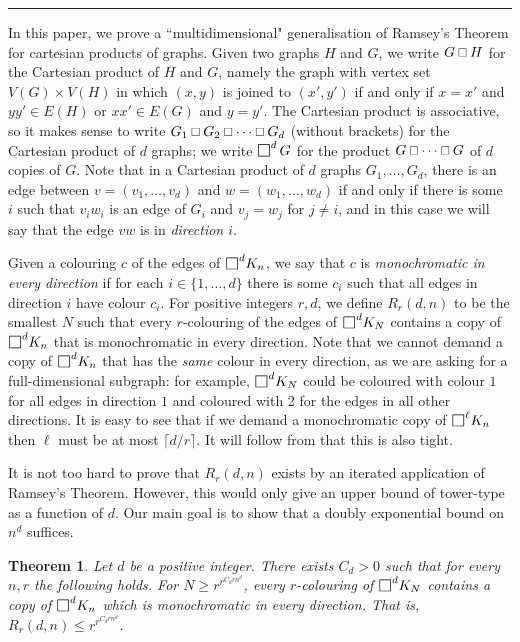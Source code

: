 \documentclass[10pt]{article}
\newtheorem{theorem}{Theorem}[section]
\DeclareMathOperator*{\ourbox}{\text{\raisebox{-0.25ex}{\scalebox{1.25}{$\square$}}}}
\newcommand\Osq{\mathbin{\text{\scalebox{.84}{$\square$}}}}
\begin{document}
\medskip\hrule\medskip
\setcounter{section}{1}\setcounter{theorem}{0}
In this paper, we prove a ``multidimensional" generalisation of Ramsey's Theorem for cartesian products of graphs. 
Given two graphs $H$ and $G$, we write $G\Osq H$ for the Cartesian product of $H$ and $G$, namely the graph 
with vertex set $V(G)\times V(H)$ in which $(x,y)$ is joined to $(x',y')$ if and only if $x=x'$ and $yy'\in E(H)$ 
or $xx'\in E(G)$ and $y=y'$.  The Cartesian product is associative, so it makes sense to write $G_1\Osq G_2\Osq\cdots\Osq G_d$ (without brackets) for the Cartesian product of $d$ graphs; we write $\ourbox^{d}G$ 
for the product $G\Osq\cdots\Osq G$ of $d$ copies of $G$. Note that in a Cartesian product of $d$ graphs $G_1,\dots,G_d$, there is an edge between $v=(v_1,\dots,v_d)$ and $w=(w_1,\dots,w_d)$ if and only if there is some $i$ such that $v_iw_i$ is an edge of $G_i$ and $v_j=w_j$ for $j\ne i$, and in this case we will say that the edge $vw$ is in {\em direction $i$}.

Given a colouring $c$ of the edges of $\ourbox^{d}\!K_n$, we say that $c$ is {\em monochromatic in every direction} if for each $i\in\{1,\dots,d\}$ there is some $c_i$ such that all edges in direction $i$ have colour $c_i$.  
For positive integers $r,d$, we define 
$R_r(d,n)$ to be the smallest $N$ such that every $r$-colouring of the edges of $\ourbox^{d}\!K_N$ contains a copy of $\ourbox^d\!K_n$ that is monochromatic in every direction.  Note that we cannot demand a copy of $\ourbox^{d}\!K_n$ that has the {\em same} colour in every direction, as we are asking for a full-dimensional subgraph: for example, $\ourbox^{d}\!K_N$ could be coloured with colour $1$ for all edges in direction $1$ and  coloured with 2 for the edges in all other directions. It is easy to see that if we demand a monochromatic copy of $\ourbox^{\ell}\!K_n$ then $\ell$ must be at most $\lceil d/r\rceil$. It will follow from  that this is also tight.
%
%

It is not too hard to prove that $R_r(d,n)$ exists by an iterated application of Ramsey's Theorem. However, this would only give an upper bound of tower-type as a function of $d$. Our main goal is to show that a doubly exponential bound on $n^{d}$ suffices. 
\begin{theorem}\label{thm:mainRamsey}
%
Let $d$ be a positive integer. There exists $C_d>0$ such that for every $n,r$ the following holds. 
For $N\geq r^{r^{C_drn^{d}}}$,
every $r$-colouring of $\ourbox^{d}\!K_N $ contains a copy of $\ourbox^{d}\!K_n$ which is monochromatic in every direction. That is, $R_r(d,n)\leq r^{r^{C_drn^d}}$.
\end{theorem}
\end{document}
